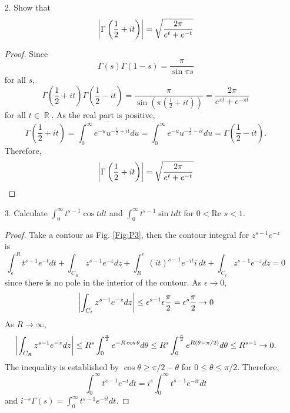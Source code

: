 \documentclass{article}
\DeclareMathOperator{\rr}{\mathbb{R}}
\begin{document}
\begin{enumerate}
\item[2.] Show that
\begin{equation*}
\abs{\Gamma\left(\frac{1}{2}+it\right)}=\sqrt{\frac{2\pi}{e^t+e^{-t}}}
\end{equation*}
\begin{proof}
Since
\begin{equation*}
\Gamma(s)\Gamma(1-s)=\frac{\pi}{\sin\pi s}
\end{equation*}
for all $s$,
\begin{equation*}
\Gamma\left(\frac{1}{2}+it\right)\Gamma\left(\frac{1}{2}-it\right)=\frac{\pi}{\sin\left(\pi(\frac{1}{2}+it)\right)}=\frac{2\pi}{e^{\pi t}+e^{-\pi t}}
\end{equation*}
for all $t\in \rr$. As the real part is positive,
\begin{equation*}
\overline{\Gamma\left(\frac{1}{2}+it\right)}=\overline{\int_0^\infty e^{-u}u^{-\frac{1}{2}+it}du}=\int_0^\infty e^{-u}u^{-\frac{1}{2}-it}du=\Gamma\left(\frac{1}{2}-it\right).
\end{equation*}
Therefore,
\begin{equation*}
\abs{\Gamma\left(\frac{1}{2}+it\right)}=\sqrt{\frac{2\pi}{e^t+e^{-t}}}
\end{equation*}
\end{proof}

\item[3.] Calculate $\int_0^\infty t^{s-1}\cos t dt $ and $\int_0^\infty t^{s-1}\sin t dt$ for $0<\text{Re } s<1$.
\begin{proof}
Take a contour as Fig. \ref{Fig:P3}, then the contour integral for $z^{s-1}e^{-z}$ is
\begin{equation*}
\int_\epsilon^R t^{s-1}e^{-t} dt+\int_{C_R}z^{s-1}e^{-z} dz+\int_R^\epsilon (it)^{s-1} e^{-it} i~dt+\int_{C_\epsilon}z^{s-1}e^{-z} dz=0
\end{equation*}
since there is no pole in the interior of the contour. As $\epsilon\rightarrow 0$,
\begin{equation*}
\abs{\int_{C_\epsilon}z^{s-1}e^{-z} dz}\leq \epsilon^{s-1}\epsilon\frac{\pi}{2}=\epsilon^s \frac{\pi}{2}\rightarrow 0
\end{equation*}
As $R\rightarrow \infty$,
\begin{equation*}
\abs{\int_{C_R}z^{s-1}e^{-z} dz}\leq R^s \int_0^{\frac{\pi}{2}} e^{-R\cos\theta}d\theta\leq R^s \int_0^{\frac{\pi}{2}} e^{R(\theta-\pi/2)}d\theta\leq R^{s-1}\rightarrow 0.
\end{equation*}
The inequality is established by $\cos\theta\geq\pi/2-\theta$ for $0\leq\theta\leq\pi/2$.
Therefore,
\begin{equation*}
\int_0^\infty t^{s-1}e^{-t}dt=i^s\int_0^\infty t^{s-1}e^{-it}dt 
\end{equation*}
and $i^{-s}\Gamma(s)=\int_0^\infty t^{s-1}e^{-it}dt$.


\end{proof}
\end{enumerate}
\end{document}
